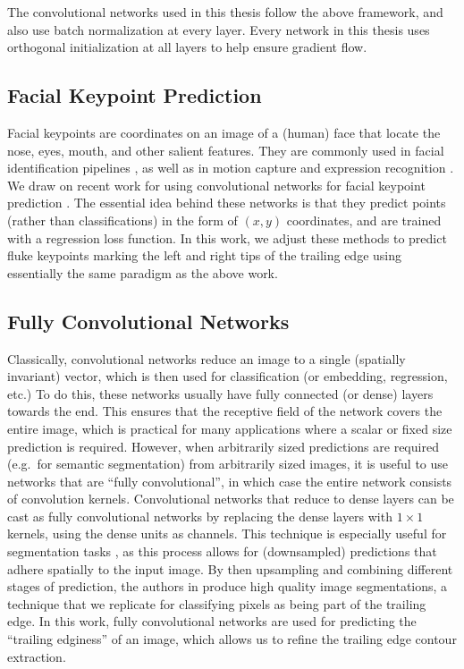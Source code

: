 The convolutional networks used in this thesis follow the above framework, and also use batch normalization \cite{ioffe2015batch} at every layer.
Every network in this thesis uses orthogonal initialization \cite{saxe2013exact} at all layers to help ensure gradient flow.

\subsection{Facial Keypoint Prediction}

Facial keypoints are coordinates on an image of a (human) face that locate the nose, eyes, mouth, and other salient features.
They are commonly used in facial identification pipelines \cite{taigman2014deepface}, as well as in motion capture \cite{akagi2013facial} and expression recognition \cite{berretti20113d}.
We draw on recent work for using convolutional networks for facial keypoint prediction \cite{sun2013deep, nouri2014using}. 
The essential idea behind these networks is that they predict points (rather than classifications) in the form of $(x, y)$ coordinates, and are trained with a regression loss function.
In this work, we adjust these methods to predict fluke keypoints marking the left and right tips of the trailing edge using essentially the same paradigm as the above work.

\subsection{Fully Convolutional Networks}

Classically, convolutional networks reduce an image to a single (spatially invariant) vector, which is then used for classification (or embedding, regression, etc.)
To do this, these networks usually have fully connected (or dense) layers towards the end.
This ensures that the receptive field of the network covers the entire image, which is practical for many applications where a scalar or fixed size prediction is required. 
However, when arbitrarily sized predictions are required (e.g.\ for semantic segmentation) from arbitrarily sized images, it is useful to use networks that are ``fully convolutional'', in which case the entire network consists of convolution kernels. 
Convolutional networks that reduce to dense layers can be cast as fully convolutional networks by replacing the dense layers with $1\times1$ kernels, using the dense units as channels.
This technique is especially useful for segmentation tasks \cite{ning2005toward, ciresan2012deep, hariharan2014simultaneous}, as this process allows for (downsampled) predictions that adhere spatially to the input image.
By then upsampling and combining different stages of prediction, the authors in \cite{long2015fully} produce high quality image segmentations, a technique that we replicate for classifying pixels as being part of the trailing edge.
In this work, fully convolutional networks are used for predicting the ``trailing edginess'' of an image, which allows us to refine the trailing edge contour extraction. 

